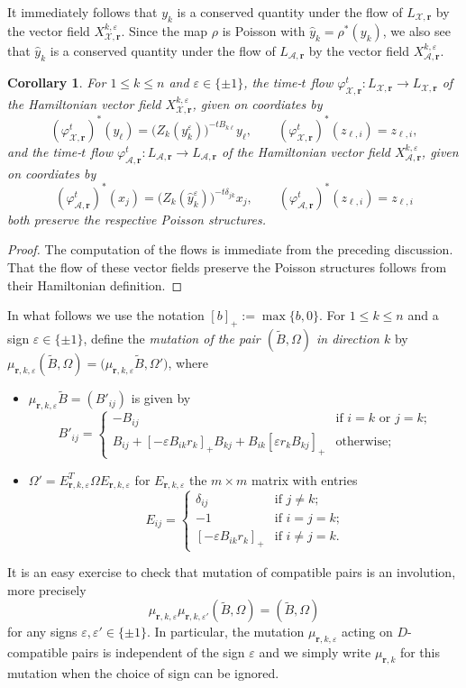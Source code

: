 \documentclass{amsart}
\newtheorem{corollary}[theorem]{Corollary}
\numberwithin{equation}{section}
\newcommand{\bfr}{{\boldsymbol{r}}}
\newcommand{\cA}{\mathcal{A}}
\newcommand{\cX}{\mathcal{X}}
\renewcommand{\max}{\operatorname{max}}
\begin{document}
It immediately follows that $y_k$ is a conserved quantity under the flow of $L_{\cX,\bfr}$ by the vector field $X_{\cX,\bfr}^{k,\varepsilon}$.
Since the map $\rho$ is Poisson with $\hat y_k=\rho^*(y_k)$, we also see that $\hat y_k$ is a conserved quantity under the flow of $L_{\cA,\bfr}$ by the vector field $X_{\cA,\bfr}^{k,\varepsilon}$.
\begin{corollary}
  \label{cor:time-one flows}
  For $1\le k\le n$ and $\varepsilon\in\{\pm1\}$, the time-$t$ flow $\varphi_{\cX,\bfr}^t:L_{\cX,\bfr}\to L_{\cX,\bfr}$ of the Hamiltonian vector field $X_{\cX,\bfr}^{k,\varepsilon}$, given on coordiates by
  \[(\varphi_{\cX,\bfr}^t)^*(y_\ell)=\big(Z_k(y_k^\varepsilon)\big)^{-tB_{k\ell}}y_\ell,\qquad (\varphi_{\cX,\bfr}^t)^*(z_{\ell,i})=z_{\ell,i},\]
  and the time-$t$ flow $\varphi_{\cA,\bfr}^t:L_{\cA,\bfr}\to L_{\cA,\bfr}$ of the Hamiltonian vector field $X_{\cA,\bfr}^{k,\varepsilon}$, given on coordiates by
  \[(\varphi_{\cA,\bfr}^t)^*(x_j)=\big(Z_k(\hat y_k^\varepsilon)\big)^{-t\delta_{jk}}x_j,\qquad (\varphi_{\cA,\bfr}^t)^*(z_{\ell,i})=z_{\ell,i}\]
  both preserve the respective Poisson structures.
\end{corollary}
\begin{proof}
  The computation of the flows is immediate from the preceding discussion.
  That the flow of these vector fields preserve the Poisson structures follows from their Hamiltonian definition.
\end{proof}

In what follows we use the notation $[b]_+:=\max\{b,0\}$.
For $1\le k\le n$ and a sign $\varepsilon\in\{\pm1\}$, define the \emph{mutation of the pair $(\tilde B,\Omega)$ in direction $k$} by $\mu_{\bfr,k,\varepsilon}(\tilde B,\Omega)=\big(\mu_{\bfr,k,\varepsilon}\tilde B,\Omega'\big)$, where
\begin{itemize}
  \item $\mu_{\bfr,k,\varepsilon}\tilde B=(B'_{ij})$ is given by
    \[B'_{ij}=\begin{cases}-B_{ij} & \text{if $i=k$ or $j=k$;}\\ B_{ij} + [-\varepsilon B_{ik}r_k]_+ B_{kj} + B_{ik} [\varepsilon r_kB_{kj}]_+ & \text{otherwise;}\end{cases}\]
  \item $\Omega'=E_{\bfr,k,\varepsilon}^T\Omega E_{\bfr,k,\varepsilon}$ for $E_{\bfr,k,\varepsilon}$ the $m\times m$ matrix with entries
    \[E_{ij}=\begin{cases}\delta_{ij} & \text{if $j\ne k$;}\\ -1 & \text{if $i=j=k$;}\\ [-\varepsilon B_{ik}r_k]_+ & \text{if $i\ne j=k$.}\end{cases}\]
\end{itemize}
It is an easy exercise to check that mutation of compatible pairs is an involution, more precisely 
\[\mu_{\bfr,k,\varepsilon}\mu_{\bfr,k,\varepsilon'}(\tilde B,\Omega)=(\tilde B,\Omega)\]
for any signs $\varepsilon,\varepsilon'\in\{\pm1\}$.
In particular, the mutation $\mu_{\bfr,k,\varepsilon}$ acting on $D$-compatible pairs is independent of the sign $\varepsilon$ and we simply write $\mu_{\bfr,k}$ for this mutation when the choice of sign can be ignored.
\end{document}

